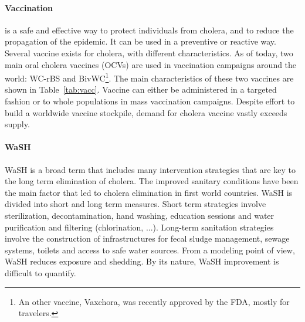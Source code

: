 \paragraph{Vaccination} is a safe and effective way to protect individuals from cholera, and to reduce the propagation of the epidemic. It can be used in a preventive or reactive way. Several vaccine exists for cholera, with different characteristics. As of today, two main oral cholera vaccines (OCVs) are used in vaccination campaigns around the world: WC-rBS and BivWC\footnote{An other vaccine, Vaxchora, was recently approved by the FDA, mostly for travelers.}. The main characteristics of these two vaccines are shown in Table~\ref{tab:vacc}\cite{WHO:CholeraVaccinesWHO:2017,WHO:BackgroundPaperWholeCell:2017,Azman:PopulationLevelEffectCholera:2016,Luquero:FirstOutbreakResponse:2013}. Vaccine can either be administered in a targeted fashion or to whole populations in mass vaccination campaigns. Despite effort to build a worldwide vaccine stockpile, demand for cholera vaccine vastly exceeds supply\cite{Parker:AdaptingGlobalShortage:2017a,Seidlein:PreventingCholeraOutbreaks:2018s}.


\paragraph{WaSH} WaSH is a broad term that includes many intervention strategies that are key to the long term elimination of cholera. The improved sanitary conditions have been the main factor that led to cholera elimination  in first world countries. WaSH is divided into short and long term measures. Short term strategies involve sterilization, decontamination, hand washing, education sessions and water purification and filtering (chlorination, ...)\cite{Rebaudet:NationalAlertresponseStrategy:2018,Fewtrell:WaterSanitationHygiene:2005}. Long-term sanitation strategies involve the construction of infrastructures for fecal sludge management, sewage systems, toilets and access to safe water sources. From a modeling point of view, WaSH reduces exposure and shedding. By its nature, WaSH improvement is difficult to quantify.





